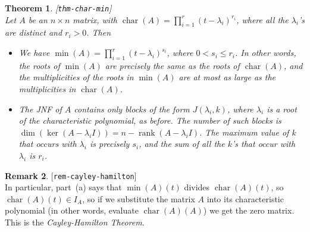 \documentclass{amsart}
\newcommand{\lbl}[1]{\label{#1}\textup{[\texttt{#1}]}\ \\}
\newcommand{\lbl}{\label}
\newcommand{\chr}       {\operatorname{char}}
\newcommand{\rank}      {\operatorname{rank}}
\newcommand{\lm}        {\lambda}
\newcommand{\tm}        {\times}
\renewcommand{\:}{\colon}
\newtheorem{theorem}{Theorem}[section]
\theoremstyle{definition}
\newtheorem{remark}[theorem]{Remark}
\begin{document}
\begin{theorem}\lbl{thm-char-min}
 Let $A$ be an $n\tm n$ matrix, with
 $\chr(A)=\prod_{i=1}^r(t-\lm_i)^{r_i}$, where all the $\lm_i$'s are
 distinct and $r_i>0$.  Then
 \begin{itemize}
  \item[(a)] We have $\min(A)=\prod_{i=1}^r(t-\lm_i)^{s_i}$, where
   $0<s_i\leq r_i$.  In other words, the roots of $\min(A)$ are
   precisely the same as the roots of $\chr(A)$, and the
   multiplicities of the roots in $\min(A)$ are at most as large as
   the multiplicities in $\chr(A)$.
  \item[(b)] The JNF of $A$ contains only blocks of the form
   $J(\lm_i,k)$, where $\lm_i$ is a root of the characteristic
   polynomial, as before.  The number of such blocks is
   $\dim(\ker(A-\lm_iI))=n-\rank(A-\lm_iI)$.  The maximum value of $k$
   that occurs with $\lm_i$ is precisely $s_i$, and the sum of all the
   $k$'s that occur with $\lm_i$ is $r_i$.
 \end{itemize}
\end{theorem}
\begin{remark}\lbl{rem-cayley-hamilton}
 In particular, part~(a) says that $\min(A)(t)$ divides $\chr(A)(t)$,
 so $\chr(A)(t)\in I_A$, so if we substitute the matrix $A$ into its
 characteristic polynomial (in other words, evaluate $\chr(A)(A)$) we
 get the zero matrix.  This is the \emph{Cayley-Hamilton Theorem}.
\end{remark}
\end{document}
